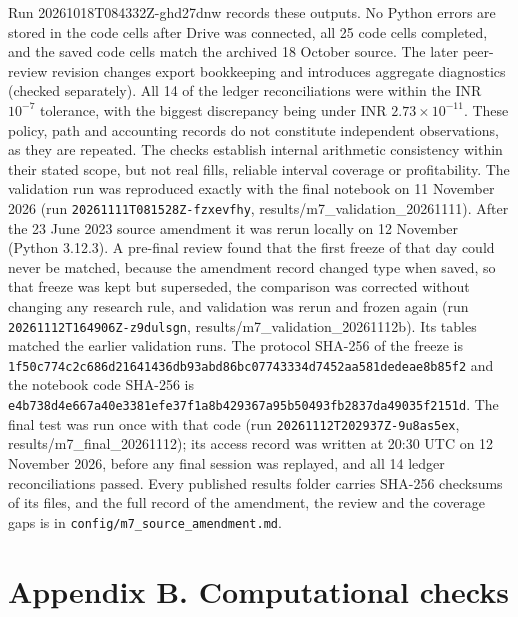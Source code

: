 \documentclass[11pt,a4paper]{article}
\begin{document}
Run 20261018T084332Z-ghd27dnw records these outputs. No Python errors are stored in the code cells after Drive was connected, all 25 code cells completed, and the saved code cells match the archived 18 October source. The later peer-review revision changes export bookkeeping and introduces aggregate diagnostics (checked separately). All 14 of the ledger reconciliations were within the INR $10^{-7}$ tolerance, with the biggest discrepancy being under INR $2.73\times10^{-11}$. These policy, path and accounting records do not constitute independent observations, as they are repeated. The checks establish internal arithmetic consistency within their stated scope, but not real fills, reliable interval coverage or profitability. The validation run was reproduced exactly with the final notebook on 11 November 2026 (run \nolinkurl{20261111T081528Z-fzxevfhy}, results/m7\_validation\_20261111). After the 23 June 2023 source amendment it was rerun locally on 12 November (Python 3.12.3). A pre-final review found that the first freeze of that day could never be matched, because the amendment record changed type when saved, so that freeze was kept but superseded, the comparison was corrected without changing any research rule, and validation was rerun and frozen again (run \nolinkurl{20261112T164906Z-z9dulsgn}, results/m7\_validation\_20261112b). Its tables matched the earlier validation runs. The protocol SHA-256 of the freeze is \nolinkurl{1f50c774c2c686d21641436db93abd86bc07743334d7452aa581dedeae8b85f2} and the notebook code SHA-256 is \nolinkurl{e4b738d4e667a40e3381efe37f1a8b429367a95b50493fb2837da49035f2151d}. The final test was run once with that code (run \nolinkurl{20261112T202937Z-9u8as5ex}, results/m7\_final\_20261112); its access record was written at 20:30 UTC on 12 November 2026, before any final session was replayed, and all 14 ledger reconciliations passed. Every published results folder carries SHA-256 checksums of its files, and the full record of the amendment, the review and the coverage gaps is in \nolinkurl{config/m7_source_amendment.md}.

\clearpage
\section*{Appendix B. Computational checks}
\end{document}
